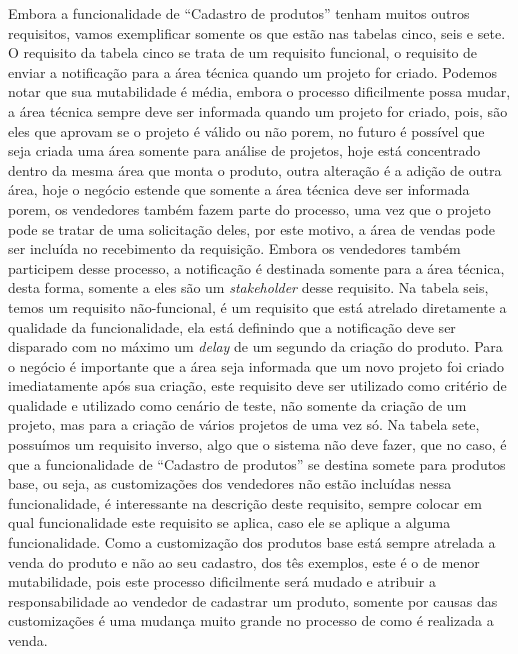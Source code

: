       Embora a funcionalidade de “Cadastro de produtos” tenham muitos outros requisitos,
      vamos exemplificar somente os que estão nas tabelas cinco, seis e sete.
      O requisito da tabela cinco se trata de um requisito funcional, o requisito de
      enviar a notificação para a área técnica quando um projeto for criado. Podemos
      notar que sua mutabilidade é média, embora o processo dificilmente possa mudar,
      a área técnica sempre deve ser informada quando um projeto for criado, pois,
      são eles que aprovam se o projeto é válido ou não porem, no futuro é possível
      que seja criada uma área somente para análise de projetos, hoje está
      concentrado dentro da mesma área que monta o produto, outra alteração é a
      adição de outra área, hoje o negócio estende que somente a área técnica deve
      ser informada porem, os vendedores também fazem parte do processo, uma vez que
      o projeto pode se tratar de uma solicitação deles, por este motivo, a área de
      vendas pode ser incluída no recebimento da requisição. Embora os vendedores
      também participem desse processo, a notificação é destinada somente para a área
      técnica, desta forma, somente a eles são um \textit{stakeholder} desse
      requisito. Na tabela seis, temos um requisito não-funcional, é um requisito
      que está atrelado diretamente a qualidade da funcionalidade, ela está definindo
      que a notificação deve ser disparado com no máximo um \textit{delay} de um
      segundo da criação do produto. Para o negócio é importante que a área seja
      informada que um novo projeto foi criado imediatamente após sua criação, este
      requisito deve ser utilizado como critério de qualidade e utilizado como cenário
      de teste, não somente da criação de um projeto, mas para a criação de vários
      projetos de uma vez só. Na tabela sete, possuímos um requisito inverso, algo
      que o sistema não deve fazer, que no caso, é que a funcionalidade de “Cadastro
      de produtos” se destina somete para produtos base, ou seja, as customizações
      dos vendedores não estão incluídas nessa funcionalidade, é interessante na
      descrição deste requisito, sempre colocar em qual funcionalidade este requisito
      se aplica, caso ele se aplique a alguma funcionalidade. Como a customização
      dos produtos base está sempre atrelada a venda do produto e não ao seu
      cadastro, dos tês exemplos, este é o de menor mutabilidade,
      pois este processo dificilmente será mudado e atribuir a responsabilidade ao
      vendedor de cadastrar um produto, somente por causas das customizações é uma
      mudança muito grande no processo de como é realizada a venda.

